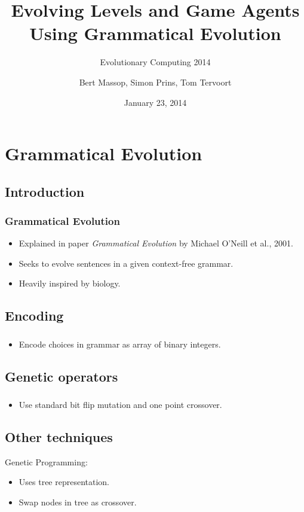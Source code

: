 \documentclass{beamer}
\title{Evolving Levels and Game Agents Using Grammatical Evolution}
\subtitle{Evolutionary Computing 2014}
\author{Bert Massop, Simon Prins, Tom Tervoort}
\date{January 23, 2014}
\makeatletter
\newcommand*{\currentname}{\@currentlabelname}
\makeatother
\begin{document}
\begin{frame}
\titlepage
\end{frame}

\section{Grammatical Evolution}
\subsection{Introduction}
\begin{frame}
\frametitle{Grammatical Evolution}
\begin{itemize}
\item Explained in paper \textit{Grammatical Evolution} by Michael O'Neill et al., 2001.
\item Seeks to evolve sentences in a given context-free grammar.
\item Heavily inspired by biology.
\end{itemize}
\end{frame}

\subsection{Encoding}
\begin{frame}
\frametitle{\currentname}
\begin{itemize}
\item Encode choices in grammar as array of binary integers.
\end{itemize}
\end{frame}

\subsection{Genetic operators}
\begin{frame}
\frametitle{\currentname}
\begin{itemize}
\item Use standard bit flip mutation and one point crossover.
\end{itemize}
\end{frame}

\subsection{Other techniques}
\begin{frame}
Genetic Programming:
\begin{itemize}
\item Uses tree representation.
\item Swap nodes in tree as crossover.
\end{itemize}
\end{frame}
\end{document}
